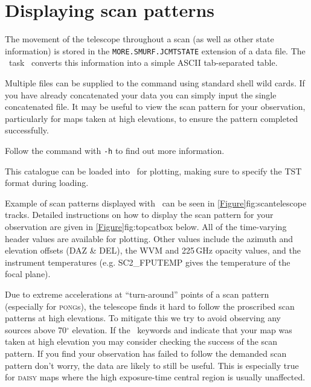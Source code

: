 \documentclass[11pt,oneside,chapters]{starlink}
\begin{document}
\section{Displaying scan patterns}
\label{sec:scan}

The movement of the telescope throughout a scan (as well as other
state information) is stored in the \texttt{MORE.SMURF.JCMTSTATE}
extension of a data file. The \smurf\ task \jcmtstate\ converts this
information into a simple ASCII tab-separated table.

\begin{terminalv}
\end{terminalv}

Multiple files can be supplied to the command using standard shell
wild cards. If you have already concatenated your data you can simply
input the single concatenated file. It may be useful to view the scan
pattern for your observation, particularly for maps taken at high
elevations, to ensure the pattern completed successfully.


\begin{tip}
  Follow the  command with \texttt{-h} to find out
  more information.
\end{tip}


This catalogue can be loaded into \topcat\ for plotting, making sure
to specify the TST format during loading.

\begin{terminalv}
\end{terminalv}

Example of scan patterns displayed with \topcat\ can be seen in
\cref{Figure}{fig:scan}{telescope tracks}. Detailed instructions on
how to display the scan pattern for your observation are given in
\cref{Figure}{fig:topcat}{box below}.  All of the time-varying header
values are available for plotting. Other values include the azimuth
and elevation offsets (DAZ \& DEL), the WVM and 225\,GHz opacity
values, and the instrument temperatures (e.g.  SC2\_FPUTEMP gives the
temperature of the focal plane).

Due to extreme accelerations at ``turn-around'' points of a scan
pattern (especially for \textsc{pong}s), the telescope finds it hard
to follow the proscribed scan patterns at high elevations. To mitigate
this we try to avoid observing any sources above 70$^\circ$ elevation.
If the \fitslist\ keywords  and 
indicate that your map was taken at high elevation you may consider
checking the success of the scan pattern. If you find your observation
has failed to follow the demanded scan pattern don't worry, the data are
likely to still be useful. This is especially true for \textsc{daisy}
maps where the high exposure-time central region is usually
unaffected.
\end{document}
